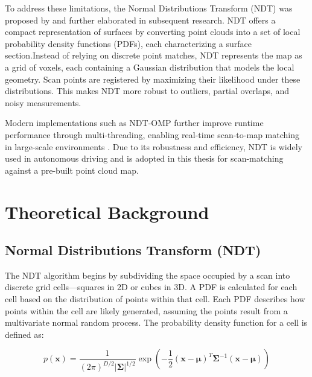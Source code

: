 To address these limitations, the Normal Distributions Transform (NDT) was proposed by \cite{biber2003ndt} and
further elaborated in subsequent research\cite{magnusson2007ndt}.  NDT offers a compact representation
of surfaces by converting point clouds into a set of local probability density functions
(PDFs), each characterizing a surface section.Instead of relying on discrete point matches, NDT represents the map as a grid of voxels, each containing a Gaussian distribution that models the local geometry. Scan points are registered by maximizing their likelihood under these distributions. This makes NDT more robust to outliers, partial overlaps, and noisy measurements.

Modern implementations such as NDT-OMP further improve runtime performance through multi-threading, enabling real-time scan-to-map matching in large-scale environments \cite{koide2019portable}. Due to its robustness and efficiency, NDT is widely used in autonomous driving and is adopted in this thesis for scan-matching against a pre-built point cloud map.

\section{Theoretical Background }

\subsection{Normal Distributions Transform (NDT)}

The NDT algorithm begins by subdividing the space occupied by a scan into discrete grid cells---squares in 2D or cubes in 3D. A PDF is calculated for each cell based on the distribution of points within that cell. Each PDF describes how points within the cell are likely generated, assuming the points result from a multivariate normal random process. The probability density function for a cell is defined as:

\begin{equation}
p(\mathbf{x}) = \frac{1}{(2\pi)^{D/2}|\mathbf{\Sigma}|^{1/2}} \exp\left(-\frac{1}{2}(\mathbf{x}-\mathbf{\mu})^T\mathbf{\Sigma}^{-1}(\mathbf{x}-\mathbf{\mu})\right)
\end{equation}

